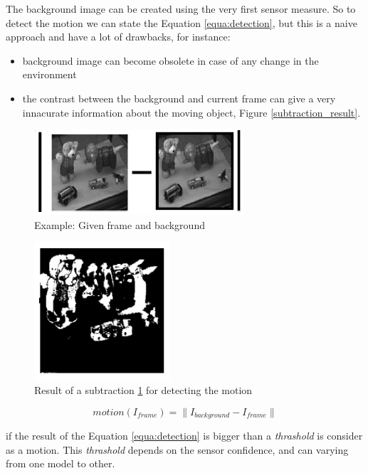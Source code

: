 \documentclass{article}
\begin{document}
The background image can be created using the very first sensor measure. So to detect the motion we can state the Equation \ref{equa:detection}, but this is a naive approach and have a lot of drawbacks, for instance:
\begin{itemize}
\item background image can become obsolete in case of any change in the environment
\item the contrast between the background and current frame can give a very innacurate information about the moving object, Figure \ref{subtraction_result}.
\end{itemize}

\begin{figure}[H]
\includegraphics[scale=0.6]{image/subtraction.png}
\caption{Example: Given frame and background}
\label{fig:subtraction}
\end{figure}

\begin{figure}[H]
\includegraphics[scale=0.6]{image/subtraction_result.png}
\caption{Result of a subtraction \ref{fig:subtraction} for detecting the motion}
\label{fig:subtraction_result}
\end{figure}

\begin{equation}
motion(I_{frame})=\parallel I_{background}-I_{frame} \parallel
\label{equa:detection}
\end{equation}

if the result of the Equation \ref{equa:detection} is bigger than a \emph{thrashold} is consider as a motion. This \emph{thrashold} depends on the sensor confidence, and can varying from one model to other. 
\end{document}
